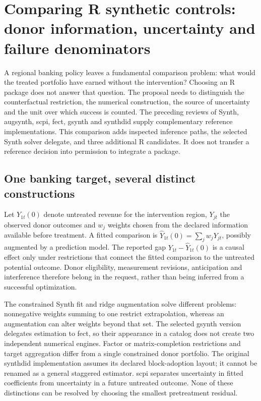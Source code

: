 \section{Comparing R synthetic controls: donor information, uncertainty and failure denominators}
\label{sec:exec25-synthetic-r-coverage}

A regional banking policy leaves a fundamental comparison problem: what would
the treated portfolio have earned without the intervention? Choosing an R
package does not answer that question. The proposal needs to distinguish the
counterfactual restriction, the numerical construction, the source of
uncertainty and the unit over which success is counted. The preceding reviews
of Synth, augsynth, scpi, fect, gsynth and synthdid supply complementary
reference implementations. This comparison adds inspected inference paths,
the selected Synth solver delegate, and three additional R candidates. It
does not transfer a reference decision into permission to integrate a package.
\citep{exec24_synth_source,exec24_augsynth_source,exec24_scpi_source,
exec24_fect_source,exec21_gsynth_wrapper,exec23_synthdid_reuse_source,
exec25_synthr_choice}

\subsection{One banking target, several distinct constructions}
Let $Y_{1t}(0)$ denote untreated revenue for the intervention region, $Y_{jt}$
the observed donor outcomes and $w_j$ weights chosen from the declared
information available before treatment. A fitted comparison is
$\widehat Y_{1t}(0)=\sum_jw_jY_{jt}$, possibly augmented by a prediction
model. The reported gap $Y_{1t}-\widehat Y_{1t}(0)$ is a causal effect only
under restrictions that connect the fitted comparison to the untreated
potential outcome. Donor eligibility, measurement revisions, anticipation
and interference therefore belong in the request, rather than being inferred
from a successful optimization.~\citep{exec25_synthr_choice}

The constrained Synth fit and ridge augmentation solve different problems:
nonnegative weights summing to one restrict extrapolation, whereas an
augmentation can alter weights beyond that set. The selected gsynth version
delegates estimation to fect, so their appearance in a catalog does not create
two independent numerical engines. Factor or matrix-completion restrictions
and target aggregation differ from a single constrained donor portfolio.
The original synthdid implementation assumes its declared block-adoption
layout; it cannot be renamed as a general staggered estimator. scpi separates
uncertainty in fitted coefficients from uncertainty in a future untreated
outcome. None of these distinctions can be resolved by choosing the smallest
pretreatment residual.~\citep{exec24_synth_source,exec24_augsynth_source,
exec21_gsynth_wrapper,exec24_fect_source,exec23_synthdid_reuse_source,
exec24_scpi_source}

